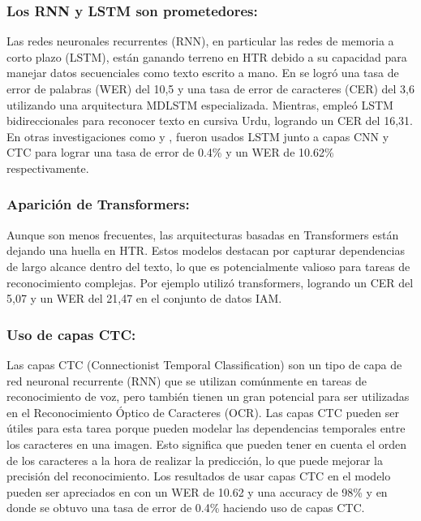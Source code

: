 \documentclass{article}
\begin{document}
\subsubsection{Los RNN y LSTM son prometedores:}
 Las redes neuronales recurrentes (RNN), en particular las redes de memoria a corto plazo (LSTM), están ganando terreno en HTR debido a su capacidad para manejar datos secuenciales como texto escrito a mano. En \cite{5} se logró una tasa de error de palabras (WER) del 10,5 y una tasa de error de caracteres (CER) del 3,6  utilizando una arquitectura MDLSTM especializada. Mientras, \cite{3} empleó LSTM bidireccionales para reconocer texto en cursiva Urdu, logrando un CER del 16,31. En otras investigaciones como \cite{8} y \cite{4}, fueron usados LSTM junto a capas CNN y CTC para lograr una tasa de error de 0.4\% y un WER de 10.62\% respectivamente.

 \subsubsection{Aparición de Transformers:}
 Aunque son menos frecuentes, las arquitecturas basadas en Transformers están dejando una huella en HTR. Estos modelos destacan por capturar dependencias de largo alcance dentro del texto, lo que es potencialmente valioso para tareas de reconocimiento complejas. Por ejemplo \cite{9} utilizó transformers, logrando un CER del 5,07 y un WER del 21,47 en el conjunto de datos IAM.

 \subsubsection{Uso de capas CTC:}
Las capas CTC (Connectionist Temporal Classification) son un tipo de capa de red neuronal recurrente (RNN) que se utilizan comúnmente en tareas de reconocimiento de voz, pero también tienen un gran potencial para ser utilizadas en el Reconocimiento Óptico de Caracteres (OCR). Las capas CTC pueden ser útiles para esta tarea porque pueden modelar las dependencias temporales entre los caracteres en una imagen. Esto significa que pueden tener en cuenta el orden de los caracteres a la hora de realizar la predicción, lo que puede mejorar la precisión del reconocimiento. Los resultados de usar capas CTC en el modelo pueden ser apreciados en \cite{4} con un WER de 10.62 y una accuracy de 98\% y en \cite{4} donde se obtuvo una tasa de error de 0.4\% haciendo uso de capas CTC. \\[10pt]
\end{document}
